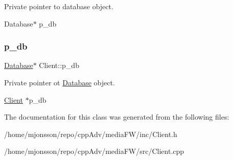 Private pointer to database object. 

Database$\ast$ p\+\_\+db \mbox{\label{classClient_ac7963f918414b58d4c752fcbcc12d965}} 
\subsubsection{\texorpdfstring{p\+\_\+db}{p\_db}}
{\footnotesize\ttfamily \hyperlink{classDatabase}{Database}$\ast$ Client\+::p\+\_\+db\hspace{0.3cm}{\ttfamily [private]}}



Private pointer ot \hyperlink{classDatabase}{Database} object. 

\hyperlink{classClient}{Client} $\ast$p\+\_\+db 

The documentation for this class was generated from the following files\+:\begin{DoxyCompactItemize}
\item 
/home/mjonsson/repo/cpp\+Adv/media\+F\+W/inc/Client.\+h\item 
/home/mjonsson/repo/cpp\+Adv/media\+F\+W/src/Client.\+cpp\end{DoxyCompactItemize}
